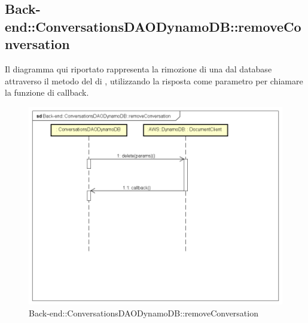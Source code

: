 \subsection{Back-end::ConversationsDAODynamoDB::removeConversation}
Il diagramma qui riportato rappresenta la rimozione di una  dal database attraverso il metodo  del  di , utilizzando la risposta come parametro per chiamare la funzione di callback.
\begin{figure}[h] \centering \includegraphics[width=\textwidth,height=\textheight,keepaspectratio]{images/diagrams/back-end/Ufficial_Backend/Back-endConversationsDAODynamoDBremoveConversation.png} 	\caption{Back-end::ConversationsDAODynamoDB::removeConversation}
\end{figure}

\newpage

